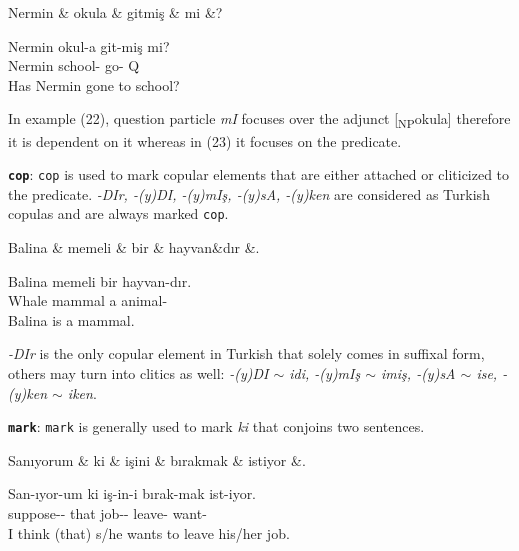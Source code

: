 \documentclass[11pt,a4paper]{article}
\begin{document}
\begin{exe}
\ex \label{aux:q}
\begin{dependency}
\begin{deptext}[column sep=0.32cm]
Nermin \& okula \& gitmiş \& mi \&? \\
\end{deptext}
\end{dependency}
\gll Nermin okul-a git-miş mi?  \\
Nermin school-\Dat{} go-\Pst{} Q \\
\glt Has Nermin gone to school?
\end{exe}

In example (22), question particle \textit{mI} focuses over the adjunct [\textsubscript{NP}okula] therefore it is dependent on it whereas in (23) it focuses on the predicate. 

\textbf{\texttt{cop}}:
\texttt{cop} is used to mark copular elements that are either attached or cliticized to the predicate. \textit{-DIr, -(y)DI, -(y)mIş, -(y)sA, -(y)ken} are considered as Turkish copulas and are always marked \texttt{cop}. 

\begin{exe}
\ex \label{cop}
\begin{dependency}
\begin{deptext}[column sep=0.32cm]
Balina \& memeli \& bir \& hayvan\&dır \&. \\
\end{deptext}
\end{dependency}
\gll Balina memeli bir hayvan-dır.  \\
Whale mammal a animal-\Cop{} \\
\glt Balina is a mammal.
\end{exe}

\textit{-DIr} is the only copular element in Turkish that solely comes in suffixal form, others may turn into clitics as well: \textit{-(y)DI $\sim$ idi, -(y)mIş $\sim$ imiş, -(y)sA $\sim$ ise, -(y)ken $\sim$ iken}.

\textbf{\texttt{mark}}:
\texttt{mark} is generally used to mark \textit{ki} that conjoins two sentences.

\begin{exe}
\ex \label{mark}
\begin{dependency}
\begin{deptext}[column sep=0.32cm]
Sanıyorum \& ki \& işini \& bırakmak \& istiyor \&. \\
\end{deptext}
\end{dependency}
\gll San-ıyor-um ki iş-in-i bırak-mak ist-iyor.  \\
 suppose-\Prog{}-\Fsg{} that job-\Tsg{}-\Acc{} leave-\Nmlz{} want-\Prog{}\\
\glt I think (that) s/he wants to leave his/her job.
\end{exe}
\end{document}
